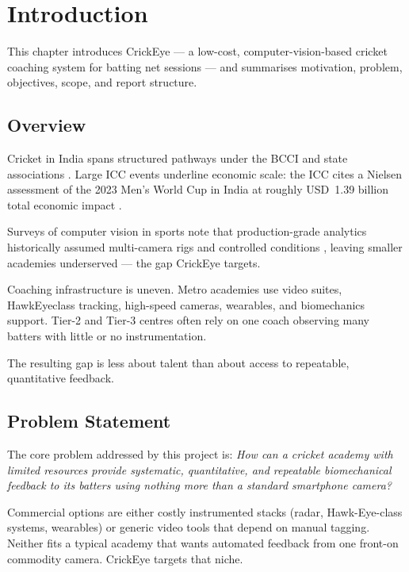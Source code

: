 \chapter{Introduction}
\begin{justify}
This chapter introduces CrickEye — a low-cost, computer-vision-based cricket coaching system for batting net sessions — and summarises motivation, problem, objectives, scope, and report structure.

\section{Overview}

\par Cricket in India spans structured pathways under the BCCI and state associations \cite{BCCIportal}. Large ICC events underline economic scale: the ICC cites a Nielsen assessment of the 2023 Men's World Cup in India at roughly USD~1.39 billion total economic impact \cite{ICC2023WorldCupIndia}.

\par Surveys of computer vision in sports note that production-grade analytics historically assumed multi-camera rigs and controlled conditions \cite{Thomas2017}, leaving smaller academies underserved --- the gap CrickEye targets.

\par Coaching infrastructure is uneven. Metro academies use video suites, Hawk\-Eye\-class tracking, high-speed cameras, wearables, and biomechanics support. Tier-2 and Tier-3 centres often rely on one coach observing many batters with little or no instrumentation.

\par The resulting gap is less about talent than about access to repeatable, quantitative feedback.

\section{Problem Statement}

\par The core problem addressed by this project is: \textit{How can a cricket academy with limited resources provide systematic, quantitative, and repeatable biomechanical feedback to its batters using nothing more than a standard smartphone camera?}

\par Commercial options are either costly instrumented stacks (radar, Hawk-Eye-class systems, wearables) or generic video tools that depend on manual tagging. Neither fits a typical academy that wants automated feedback from one front-on commodity camera. CrickEye targets that niche.


\end{justify}
